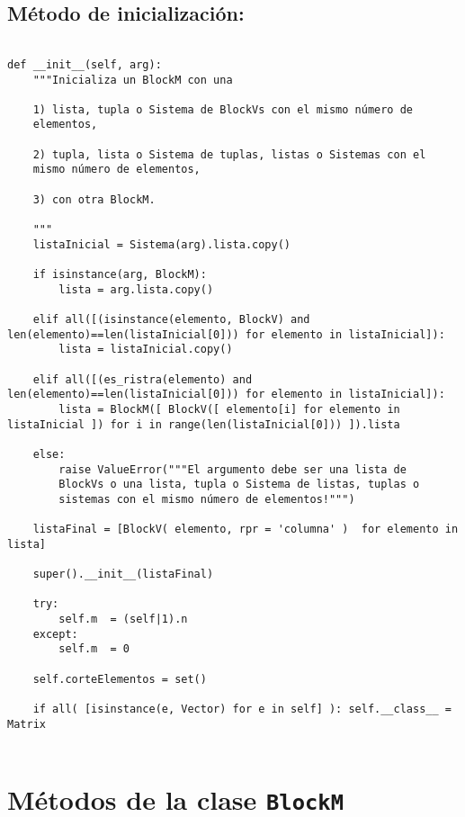 \documentclass[11pt]{report}
\begin{document}
\subsection{Método de inicialización:}
\label{sec:org7ee2c2d}

\begin{verbatim}

def __init__(self, arg):
    """Inicializa un BlockM con una

    1) lista, tupla o Sistema de BlockVs con el mismo número de
    elementos,
    
    2) tupla, lista o Sistema de tuplas, listas o Sistemas con el
    mismo número de elementos,
    
    3) con otra BlockM.

    """    
    listaInicial = Sistema(arg).lista.copy()

    if isinstance(arg, BlockM):
        lista = arg.lista.copy()
        
    elif all([(isinstance(elemento, BlockV) and len(elemento)==len(listaInicial[0])) for elemento in listaInicial]):
        lista = listaInicial.copy()

    elif all([(es_ristra(elemento) and len(elemento)==len(listaInicial[0])) for elemento in listaInicial]):
        lista = BlockM([ BlockV([ elemento[i] for elemento in listaInicial ]) for i in range(len(listaInicial[0])) ]).lista

    else: 
        raise ValueError("""El argumento debe ser una lista de
        BlockVs o una lista, tupla o Sistema de listas, tuplas o
        sistemas con el mismo número de elementos!""")

    listaFinal = [BlockV( elemento, rpr = 'columna' )  for elemento in lista]

    super().__init__(listaFinal)

    try: 
        self.m  = (self|1).n
    except:
        self.m  = 0
            
    self.corteElementos = set()
           
    if all( [isinstance(e, Vector) for e in self] ): self.__class__ = Matrix
    
\end{verbatim}

\section{Métodos de la clase \texttt{BlockM}}
\label{sec:orge671068}
\end{document}
